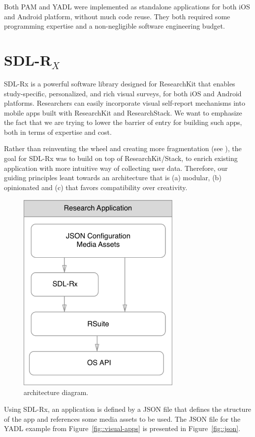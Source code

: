 \documentclass{acm_proc_article-sp}
\newcommand{\sdlrx}{SDL-R$_X$}
\begin{document}
Both PAM and YADL were implemented as standalone applications for both iOS and Android platform, without much code reuse. They both required some programming expertise and a non-negligible software engineering budget.

\section{\sdlrx}
SDL-Rx is a powerful software library designed for ResearchKit that enables study-specific, personalized, and rich visual surveys, for both iOS and Android platforms. Researchers can easily incorporate visual self-report mechanisms into mobile apps built with ResearchKit and ResearchStack. We want to emphasize the fact that we are trying to lower the barrier of entry for building such apps, both in terms of expertise and cost.

Rather than reinventing the wheel and creating more fragmentation (see \cite{noauthor_undated-ej}), the goal for SDL-Rx was to build on top of ResearchKit/Stack, to enrich existing application with more intuitive way of collecting user data. Therefore, our guiding principles leant towards an architecture that is (a) modular, (b) opinionated and (c) that favors compatibility over creativity.

\begin{figure}[h!]
\centering
\label{fig::architecture}
\includegraphics[width=8cm]{IMG/architecture.png}
\caption{architecture diagram.}
\end{figure}

Using SDL-Rx, an application is defined by a JSON file that defines the structure of the app and references some media assets to be used. The JSON file for the YADL example from Figure~\ref{fig::visual-apps} is presented in Figure~\ref{fig::json}.
\end{document}
